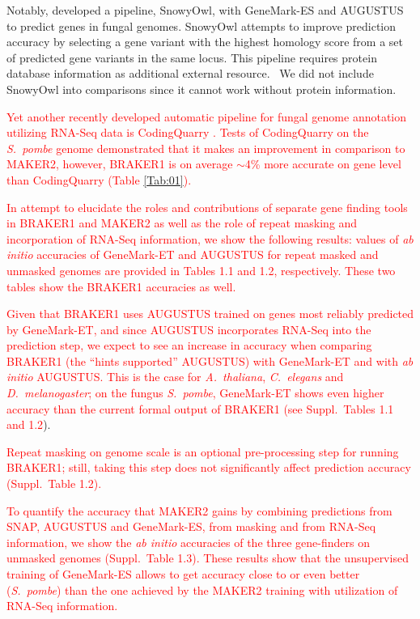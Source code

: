 \documentclass{bioinfo}
\begin{document}
Notably, \citet{SnowyOwl} developed a pipeline, SnowyOwl, with GeneMark-ES \citep{GeneMark-ES} and AUGUSTUS to predict genes in fungal genomes. SnowyOwl attempts to improve prediction accuracy by selecting a gene variant with the highest homology score from a set of predicted gene variants in the same locus. This pipeline requires protein database information as additional external resource.  We did not include SnowyOwl into comparisons since it cannot work without protein information.%

\textcolor{red}{Yet another recently developed automatic pipeline for fungal genome annotation utilizing RNA-Seq data is CodingQuarry \citep{CodingQuarry}. Tests of CodingQuarry on the \textit{S.~pombe} genome demonstrated that it makes an improvement in comparison to MAKER2, however, BRAKER1 is on average $\sim$4\% more accurate on gene level than CodingQuarry (Table \ref{Tab:01}).}

\textcolor{red}{In attempt to elucidate the roles and contributions of separate gene finding tools in BRAKER1 and MAKER2 as well as the role of repeat masking and incorporation of RNA-Seq information, we show the following results:  values of \textit{ab initio} accuracies of GeneMark-ET and AUGUSTUS for repeat masked and unmasked genomes are provided in Tables 1.1 and 1.2, respectively. These two tables show the BRAKER1 accuracies as well.}

\textcolor{red}{Given that BRAKER1 uses AUGUSTUS trained on genes most reliably predicted by GeneMark-ET, and since AUGUSTUS incorporates RNA-Seq into the prediction step, we expect to see an increase in accuracy when comparing BRAKER1 (the ``hints supported'' AUGUSTUS) with GeneMark-ET and with \textit{ab initio} AUGUSTUS. This is the case for \textit{A.~thaliana}, \textit{C.~elegans} and \textit{D.~melanogaster}; on the fungus \textit{S.~pombe}, GeneMark-ET shows even higher accuracy than the current formal output of BRAKER1 (see Suppl.~Tables 1.1 and 1.2}). 

\textcolor{red}{Repeat masking on genome scale is an optional pre-processing step for running BRAKER1; still, taking this step does not significantly affect prediction accuracy (Suppl.~Table 1.2).}

\textcolor{red}{To quantify the accuracy that MAKER2 gains by combining predictions from SNAP, AUGUSTUS and GeneMark-ES, from masking and from RNA-Seq information, we show the \textit{ab initio} accuracies of the three gene-finders on unmasked genomes (Suppl.~Table 1.3). These results show that the unsupervised training of GeneMark-ES allows to get accuracy close to or even better (\textit{S.~pombe}) than the one achieved by the MAKER2 training with utilization of RNA-Seq information.}
\end{document}
